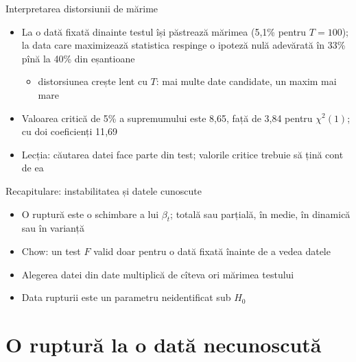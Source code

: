 \begin{frame}{Interpretarea distorsiunii de mărime}
\itemsize{\small}
\begin{itemize}
    \item La o dată fixată dinainte testul își păstrează mărimea (5{,}1\% pentru $T = 100$); la data care maximizează statistica respinge o ipoteză nulă adevărată în 33\% pînă la 40\% din eșantioane
    \begin{itemize}
        \item distorsiunea crește lent cu $T$: mai multe date candidate, un maxim mai mare
    \end{itemize}
    \item Valoarea critică de 5\% a supremumului este 8{,}65, față de 3,84 pentru $\chi^2(1)$; cu doi coeficienți 11{,}69
    \item Lecția: căutarea datei face parte din test; valorile critice trebuie să țină cont de ea
\end{itemize}
\end{frame}

\begin{frame}{Recapitulare: instabilitatea și datele cunoscute}
\itemsize{\small}
\begin{itemize}
    \item O ruptură este o schimbare a lui $\beta_t$; totală sau parțială, în medie, în dinamică sau în varianță
    \item Chow: un test $F$ valid doar pentru o dată fixată înainte de a vedea datele
    \item Alegerea datei din date multiplică de cîteva ori mărimea testului
    \item Data rupturii este un parametru neidentificat sub $H_0$
\end{itemize}
\end{frame}


\section{O ruptură la o dată necunoscută}

